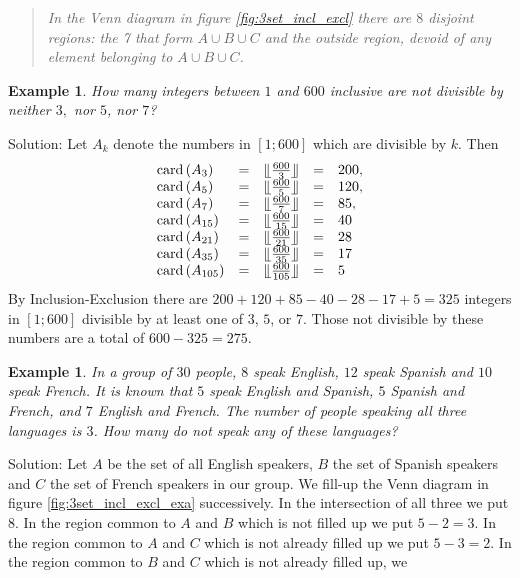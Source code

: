 \documentclass[11pt, openany]{book}
\theoremstyle{change} \theoremheaderfont{\blue\sffamily\bfseries}
\newtheorem{exa}[thm]{Example}
\theoremstyle{nonumberplain} \theoremheaderfont{\sffamily\bfseries}
\newenvironment{rem}[0]{\begin{quote}{\huge\textcolor{red}{\Pisymbol{pzd}{43}}}\itshape }{\end{quote}}
\newcommand{\í}{\'{\i}}
\def\card#1{\operatorname{card}\left(#1\right)}
\begin{document}
\begin{rem} In the Venn diagram in figure
\ref{fig:3set_incl_excl} there are $8$ disjoint regions: the 7 that
form $A \cup B \cup C$ and the outside region, devoid of any element
belonging to $A \cup B \cup C$.
\end{rem}
\begin{exa}
How many integers between $1$ and $600$ inclusive are not divisible
by neither $3,$ nor $5$, nor $7$?
\end{exa}
Solution: Let $A_k$ denote the numbers in $[1; 600]$ which are
divisible by $k$. Then
$$
\begin{array}{lllll}
\card{A_3} & = & \llfloor\frac{600}{3}\rrfloor        & = & 200, \\
\card{A_5} & = & \llfloor\frac{600}{5}\rrfloor        & = & 120, \\
\card{A_7} & = & \llfloor \frac{600}{7}\rrfloor       & = & 85, \\
\card{A_{15}} &  = & \llfloor \frac{600}{15}\rrfloor  & = & 40 \\
\card{A_{21}} &  = & \llfloor \frac{600}{21}\rrfloor  & = & 28\\
\card{A_{35}} &  = & \llfloor \frac{600}{35}\rrfloor  & = & 17 \\
\card{A_{105}} &  = &\llfloor \frac{600}{105}\rrfloor & = & 5\\
\end{array}
$$
By Inclusion-Exclusion there are $200 + 120 + 85 - 40 - 28 - 17 + 5
= 325$ integers in $[1; 600]$ divisible by at least one of $3$, $5$,
or $7$. Those not divisible by these numbers are a total of $600 -
325 = 275.$
\begin{exa}
In a group of $30$ people, $8$ speak English, $12$ speak Spanish and
$10$ speak French. It is known that $5$ speak English and Spanish,
$5$ Spanish and French, and $7$ English and French. The number of
people speaking all three languages is $3$. How many do not speak
any of these languages?

\label{exa:3set_incl_excl}\end{exa} Solution: Let $A$ be the set of
all English speakers, $B$ the set of Spanish speakers and $C$ the
set of French speakers in our group. We fill-up the  Venn diagram in
figure \ref{fig:3set_incl_excl_exa} successively. In the
intersection of all three we put 8. In the region common to $A$ and
$B$ which is not filled up we put $5 - 2 = 3$. In the region common
to $A$ and $C$ which is not already filled up we put $5 - 3 = 2$. In
the region common to $B$ and $C$ which is not already filled up, we
\end{document}
